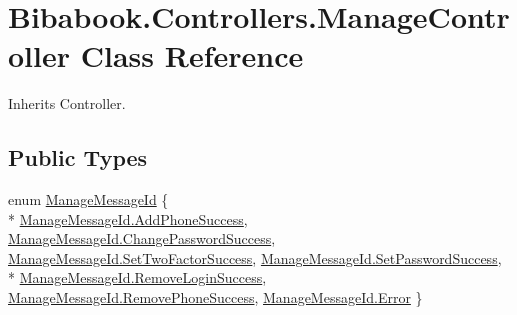 \hypertarget{class_bibabook_1_1_controllers_1_1_manage_controller}{}\section{Bibabook.\+Controllers.\+Manage\+Controller Class Reference}
\label{class_bibabook_1_1_controllers_1_1_manage_controller}


Inherits Controller.

\subsection*{Public Types}
\begin{DoxyCompactItemize}
\item 
enum \hyperlink{class_bibabook_1_1_controllers_1_1_manage_controller_a11520cf302554950f1aeac2bd8137403}{Manage\+Message\+Id} \{ \\*
\hyperlink{class_bibabook_1_1_controllers_1_1_manage_controller_a11520cf302554950f1aeac2bd8137403af08d36b2147213fadb3b223d149ac802}{Manage\+Message\+Id.\+Add\+Phone\+Success}, 
\hyperlink{class_bibabook_1_1_controllers_1_1_manage_controller_a11520cf302554950f1aeac2bd8137403a0053618c57496fec45c67daf91919394}{Manage\+Message\+Id.\+Change\+Password\+Success}, 
\hyperlink{class_bibabook_1_1_controllers_1_1_manage_controller_a11520cf302554950f1aeac2bd8137403af17987d9118fd576fed3cbec8d11bd8b}{Manage\+Message\+Id.\+Set\+Two\+Factor\+Success}, 
\hyperlink{class_bibabook_1_1_controllers_1_1_manage_controller_a11520cf302554950f1aeac2bd8137403af17ca72fcf8adaa46d5e87b12ec3a27d}{Manage\+Message\+Id.\+Set\+Password\+Success}, 
\\*
\hyperlink{class_bibabook_1_1_controllers_1_1_manage_controller_a11520cf302554950f1aeac2bd8137403a46e53931d0e837638a46368b2b04ba6a}{Manage\+Message\+Id.\+Remove\+Login\+Success}, 
\hyperlink{class_bibabook_1_1_controllers_1_1_manage_controller_a11520cf302554950f1aeac2bd8137403a70460d8db9c29752c1f591eb67a60fdc}{Manage\+Message\+Id.\+Remove\+Phone\+Success}, 
\hyperlink{class_bibabook_1_1_controllers_1_1_manage_controller_a11520cf302554950f1aeac2bd8137403a902b0d55fddef6f8d651fe1035b7d4bd}{Manage\+Message\+Id.\+Error}
 \}
\end{DoxyCompactItemize}
